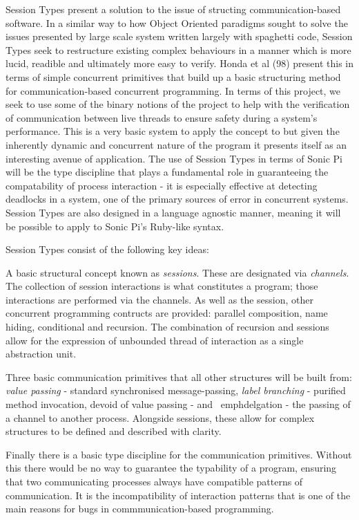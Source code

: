 \documentclass[11pt]{scrartcl}
\begin{document}
Session Types present a solution to the issue of structing communication-based 
software. In a similar way to how Object Oriented paradigms sought to solve 
the issues presented by large scale system written largely with spaghetti 
code, Session Types seek to restructure existing complex behaviours in a 
manner which is more lucid, readible and ultimately more easy to verify. Honda 
et al (98) present this in terms of simple concurrent primitives that build up 
a basic structuring method for communication-based concurrent programming. In 
terms of this project, we seek to use some of the binary notions of the 
project to help with the verification of communication between live threads to 
ensure safety during a system's performance. This is a very basic system to 
apply the concept to but given the inherently dynamic and concurrent nature of 
the program it presents itself as an interesting avenue of application. The 
use of Session Types in terms of Sonic Pi will be the type discipline that 
plays a fundamental role in guaranteeing the compatability of process 
interaction - it is especially effective at detecting deadlocks in a system, 
one of the primary sources of error in concurrent systems. Session Types are 
also designed in a language agnostic manner, meaning it will be possible to 
apply to Sonic Pi's Ruby-like syntax.

Session Types consist of the following key ideas:

A basic structural concept known as \emph{sessions}. These are designated via 
\emph{channels}. The collection of session interactions is what constitutes a 
program; those interactions are performed via the channels. As well as the 
session, other concurrent programming contructs are provided: parallel 
composition, name hiding, conditional and recursion. The combination of 
recursion and sessions allow for the expression of unbounded thread of 
interaction as a single abstraction unit.

Three basic communication primitives that all other structures will be built 
from: \emph{value passing} - standard synchronised message-passing, \emph{
label branching} - purified method invocation, devoid of value passing - and \
emph{delgation} - the passing of a channel to another process. Alongside 
sessions, these allow for complex structures to be defined and described with 
clarity.

Finally there is a basic type discipline for the communication primitives. 
Without this there would be no way to guarantee the typability of a program, 
ensuring that two communicating processes always have compatible patterns of 
communication. It is the incompatibility of interaction patterns that is one 
of the main reasons for bugs in commmunication-based programming.
\end{document}
